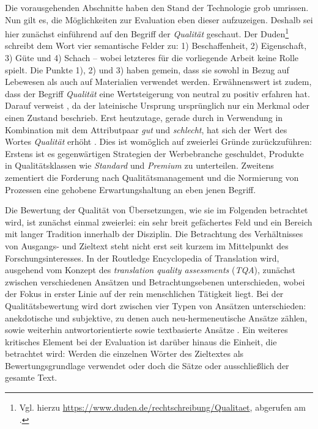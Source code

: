 Die vorausgehenden Abschnitte haben den Stand der Technologie grob umrissen. Nun gilt es, die Möglichkeiten zur Evaluation eben dieser aufzuzeigen. Deshalb sei hier zunächst einführend auf den Begriff der \emph{Qualität} geschaut. Der Duden\footnote{Vgl. hierzu \url{https://www.duden.de/rechtschreibung/Qualitaet}, abgerufen am \datum{}.} schreibt dem Wort vier semantische Felder zu: 1) Beschaffenheit, 2) Eigenschaft, 3) Güte und 4) Schach -- wobei letzteres für die vorliegende Arbeit keine Rolle spielt. Die Punkte 1), 2) und 3) haben gemein, dass sie sowohl in Bezug auf Lebewesen als auch auf Materialien verwendet werden. Erwähnenswert ist zudem, dass der Begriff \emph{Qualität} eine Wertsteigerung von neutral zu positiv erfahren hat. Darauf verweist \citet[23]{zech_qualitatsmanagement_2015}, da der lateinische Ursprung ursprünglich nur ein Merkmal oder einen Zustand beschrieb. Erst heutzutage, gerade durch in Verwendung in Kombination mit dem Attributpaar \emph{gut} und \emph{schlecht}, hat sich der Wert des Wortes \emph{Qualität} erhöht \citep[23]{zech_qualitatsmanagement_2015}. Dies ist womöglich auf zweierlei Gründe zurückzuführen: Erstens ist es gegenwärtigen Strategien der Werbebranche geschuldet, Produkte in Qualitätsklassen wie \emph{Standard} und \emph{Premium} zu unterteilen. Zweitens zementiert die Forderung nach Qualitätsmanagement und die Normierung von Prozessen eine gehobene Erwartungshaltung an eben jenen Begriff.

Die Bewertung der Qualität von Übersetzungen, wie sie im Folgenden betrachtet wird, ist zunächst einmal zweierlei: ein sehr breit gefächertes Feld und ein Bereich mit langer Tradition innerhalb der Disziplin. Die Betrachtung des Verhältnisses von Ausgangs- und Zieltext steht nicht erst seit kurzem im Mittelpunkt des Forschungsinteresses. In der Routledge Encyclopedia of Translation wird, ausgehend vom Konzept des \emph{translation quality assessments} (\emph{TQA}), zunächst zwischen verschiedenen Ansätzen und Betrachtungsebenen unterschieden, wobei der Fokus in erster Linie auf der rein menschlichen Tätigkeit liegt. Bei der Qualitätsbewertung wird dort zwischen vier Typen von Ansätzen unterschieden: anekdotische und subjektive, zu denen auch neu-hermeneutische Ansätze zählen, sowie weiterhin antwortorientierte sowie textbasierte Ansätze \citep[222]{baker_routledge_2011}. Ein weiteres kritisches Element bei der Evaluation ist darüber hinaus die Einheit, die betrachtet wird: Werden die einzelnen Wörter des Zieltextes als Bewertungsgrundlage verwendet oder doch die Sätze oder ausschließlich der gesamte Text.

